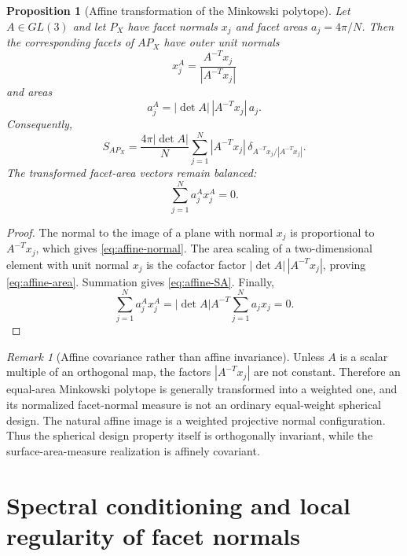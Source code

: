 \documentclass[11pt]{article}
\newtheorem{proposition}[theorem]{Proposition}
\theoremstyle{definition}
\theoremstyle{remark}
\newtheorem{remark}[theorem]{Remark}
\begin{document}
\begin{proposition}[Affine transformation of the Minkowski polytope]\label{prop:affine}
Let $A\in GL(3)$ and let $P_X$ have facet normals $x_j$ and facet areas $a_j=4\pi/N$. Then the corresponding facets of $AP_X$ have outer unit normals
\begin{equation}\label{eq:affine-normal}
x_j^A=\frac{A^{-T}x_j}{|A^{-T}x_j|}
\end{equation}
and areas
\begin{equation}\label{eq:affine-area}
a_j^A=|\det A|\,|A^{-T}x_j|\,a_j.
\end{equation}
Consequently,
\begin{equation}\label{eq:affine-SA}
S_{AP_X}
=\frac{4\pi|\det A|}{N}
\sum_{j=1}^N|A^{-T}x_j|\,
\delta_{A^{-T}x_j/|A^{-T}x_j|}.
\end{equation}
The transformed facet-area vectors remain balanced:
\begin{equation}\label{eq:affine-balance}
\sum_{j=1}^Na_j^Ax_j^A=0.
\end{equation}
\end{proposition}

\begin{proof}
The normal to the image of a plane with normal $x_j$ is proportional to $A^{-T}x_j$, which gives \eqref{eq:affine-normal}. The area scaling of a two-dimensional element with unit normal $x_j$ is the cofactor factor $|\det A|\,|A^{-T}x_j|$, proving \eqref{eq:affine-area}. Summation gives \eqref{eq:affine-SA}. Finally,
\[
\sum_{j=1}^Na_j^Ax_j^A
=|\det A|A^{-T}\sum_{j=1}^Na_jx_j=0.
\]
\end{proof}

\begin{remark}[Affine covariance rather than affine invariance]\label{rem:affine-covariance}
Unless $A$ is a scalar multiple of an orthogonal map, the factors $|A^{-T}x_j|$ are not constant. Therefore an equal-area Minkowski polytope is generally transformed into a weighted one, and its normalized facet-normal measure is not an ordinary equal-weight spherical design. The natural affine image is a weighted projective normal configuration. Thus the spherical design property itself is orthogonally invariant, while the surface-area-measure realization is affinely covariant.
\end{remark}

\section{Spectral conditioning and local regularity of facet normals}\label{sec:spectral}
\end{document}
